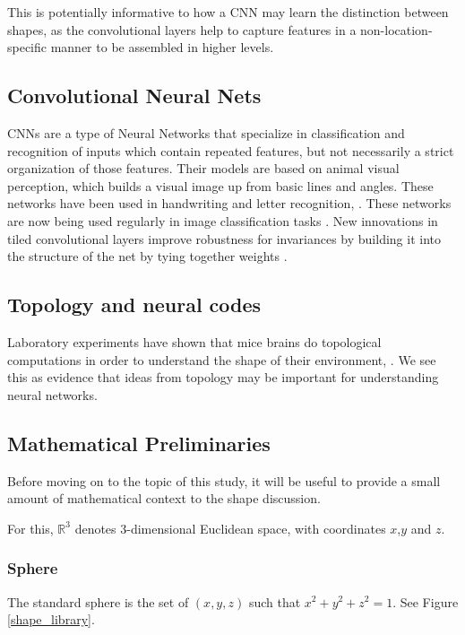 \documentclass{article}
\begin{document}
This is potentially informative to how a CNN may learn the distinction between shapes, as the convolutional layers help to
capture features in a non-location-specific manner to be assembled in higher levels.


\subsection{Convolutional Neural Nets}

CNNs are a type of Neural Networks that specialize in classification and recognition
of inputs which contain repeated features, but not necessarily a strict organization of those features.
Their models are based on animal visual perception, which builds a visual image up from basic lines and angles.
These networks have been used in handwriting and letter recognition, \cite{lecun1998gradient}. These networks are now
being used regularly in image classification tasks \cite{NIPS2012_4824}. New innovations in tiled convolutional
layers improve robustness for invariances by building it into the structure of the net by tying together weights
\cite{Le10tiledconvolutional}.

\subsection{Topology and neural codes}

Laboratory experiments have shown that mice brains do topological computations in order to understand the shape of their environment,
 \cite{curto2016can}. We see this as evidence that ideas from topology may be important for understanding neural networks.

\subsection{Mathematical Preliminaries}

Before moving on to the topic of this study, it will be useful to provide a small amount of mathematical context
to the shape discussion.

For this, $\mathbb{R}^3$ denotes 3-dimensional Euclidean space, with coordinates $x$,$y$ and $z$.

\subsubsection{Sphere}

The standard sphere is the set of $(x,y,z)$ such that $x^2 + y^2 + z^2 = 1$. See Figure \ref{shape_library}.
\end{document}
